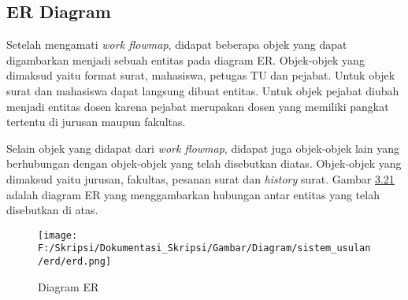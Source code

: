 \subsection{ER Diagram}
\label{sec:er_diagram}
Setelah mengamati \textit{work flowmap}, didapat beberapa objek yang dapat digambarkan menjadi sebuah entitas pada diagram ER. Objek-objek yang dimaksud yaitu format surat, mahasiswa, petugas TU dan pejabat. Untuk objek surat dan mahasiswa dapat langsung dibuat entitas. Untuk objek pejabat diubah menjadi entitas dosen karena pejabat merupakan dosen yang memiliki pangkat tertentu di jurusan maupun fakultas.\

Selain objek yang didapat dari \textit{work flowmap}, didapat juga objek-objek lain yang berhubungan dengan objek-objek yang telah disebutkan diatas. Objek-objek yang dimaksud yaitu jurusan, fakultas, pesanan surat dan \textit{history} surat. Gambar \hyperlink{erd}{3.21} adalah diagram ER yang menggambarkan hubungan antar entitas yang telah disebutkan di atas.

\begin{figure}[H]
	\centering
		\texttt{[image: F:/Skripsi/Dokumentasi\_Skripsi/Gambar/Diagram/sistem\_usulan/erd/erd.png]}
	\caption{Diagram ER}
	\label{fig:level_2-2}
\end{figure}